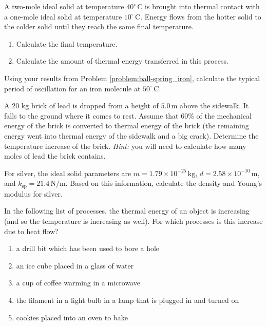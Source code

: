 \begin{exercise}
  A two-mole ideal solid at temperature $40^\circ\,\text{C}$ is
  brought into thermal contact with a one-mole ideal solid at
  temperature $10^\circ\,\text{C}$.  Energy flows from the hotter solid
  to the colder solid until they reach the same final temperature.
\begin{enumerate}
\item Calculate the final temperature.
\item Calculate the amount of thermal energy transferred in this process.
\end{enumerate}
\label{problem:calorimetry}
\end{exercise}

\begin{exercise}
  Using your results from Problem \ref{problem:ball-spring_iron},
  calculate the typical period of oscillation for an iron molecule
  at $50^\circ\,\text{C}$.
\label{problem:iron_oscillation}
\end{exercise}

\begin{exercise}
  A 20 kg brick of lead is dropped from a height of $5.0\,\text{m}$
  above the sidewalk.  It falls to the ground where it comes to rest.
  Assume that 60\% of the mechanical energy of the brick is converted
  to thermal energy of the brick (the remaining energy went into
  thermal energy of the sidewalk and a big crack).  Determine the
  temperature increase of the brick. \textit{Hint:} you will need to
  calculate how many moles of lead the brick contains. 
\label{problem:falling_brick}
\end{exercise}


\begin{exercise}
  For silver, the ideal solid parameters are $m=1.79\times
  10^{-25}\,\text{kg}$, $d=2.58\times 10^{-10}\,\text{m}$, and
  $k_\text{sp}=21.4\,\text{N/m}$.  Based on this information, calculate the
  density and Young's modulus for silver.
\label{problem:silver_ball-spring}
\end{exercise}

\begin{exercise}
  In the following list of processes, the thermal energy of an object
  is increasing (and so the temperature is increasing as well).  For
  which processes is this increase due to heat flow?
\begin{enumerate}
\item a drill bit which has been used to bore a hole
\item an ice cube placed in a glass of water
\item a cup of coffee warming in a microwave
\item the filament in a light bulb in a lamp that is plugged in and turned on
\item cookies placed into an oven to bake
\end{enumerate}
\label{problem:heat_examples}
\end{exercise}

